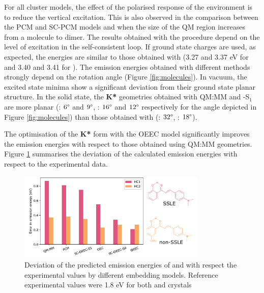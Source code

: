 For all cluster models, the effect of the polarised response of the environment is to reduce the vertical excitation. This is also observed in the comparison between the PCM and SC-PCM models and when the size of the QM region increases from a molecule to dimer. The results obtained with the \SCEEC{} procedure depend on the level of excitation in the self-consistent loop. If ground state charges are used, as expected, the energies are similar to those obtained with \EEC{} (3.27 and 3.37 eV for \HC{} and 3.40 and 3.41 for \HCC{}). The emission energies obtained with different methods strongly depend on the rotation angle (Figure \ref{fig:molecules}). In vacuum, the excited state minima show a significant deviation from their ground state planar structure. In the solid state, the \textbf{K*} geometries obtained with QM:MM and \SCEEC{}-S$_1$ are more planar (\HC{}: $6 \degree$ and $9 \degree$, \HCC{}: $16 \degree$ and $12 \degree$ respectively for the angle depicted in Figure \ref{fig:molecules}) than those obtained with \EEC{} (\HC{}: $32 \degree$, \HCC{}: $18 \degree$).






The optimisation of the \textbf{K*} form with the OEEC model significantly improves the emission energies with respect to those obtained using QM:MM geometries. Figure \ref{fig:error} summarises the deviation of the calculated emission energies with respect to the experimental data.

\begin{figure}
\centering
\includegraphics[width=9cm]{Chapters/5Ewald/scheme.pdf}
\caption{Deviation of the predicted emission energies of \HC{} and \HCC{} with respect the experimental values by different embedding models. Reference experimental values were 1.8 eV for both \HC{} and \HCC{} crystals}
\label{fig:error}
\end{figure}

